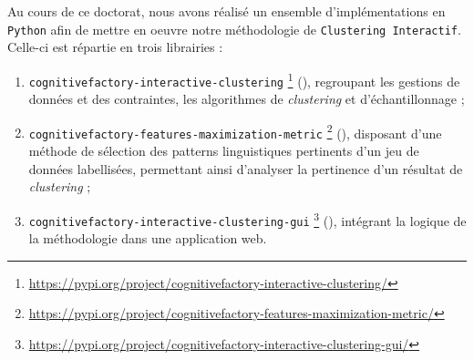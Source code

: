 \label{annex:C-ANNEXE-IMPLEMENTATIONS}

	Au cours de ce doctorat, nous avons réalisé un ensemble d'implémentations en \texttt{Python} afin de mettre en oeuvre notre méthodologie de \texttt{Clustering Interactif}.
	Celle-ci est répartie en trois librairies :
	\begin{enumerate}
		\item \texttt{cognitivefactory-interactive-clustering} \footnote{
			\url{https://pypi.org/project/cognitivefactory-interactive-clustering/}
		} (\cite{schild:2022:cognitivefactory-interactiveclustering}), regroupant les gestions de données et des contraintes, les algorithmes de \textit{clustering} et d'échantillonnage ;
		\item \texttt{cognitivefactory-features-maximization-metric} \footnote{
			\url{https://pypi.org/project/cognitivefactory-features-maximization-metric/}
		} (\cite{schild:2023:cognitivefactory-featuresmaximizationmetric}), disposant d'une méthode de sélection des patterns linguistiques pertinents d'un jeu de données labellisées, permettant ainsi d'analyser la pertinence d'un résultat de \textit{clustering} ;
		\item \texttt{cognitivefactory-interactive-clustering-gui} \footnote{
			\url{https://pypi.org/project/cognitivefactory-interactive-clustering-gui/}
		} (\cite{schild-etal:2022:cognitivefactory-interactiveclusteringgui}), intégrant la logique de la méthodologie dans une application web.
	\end{enumerate}
	
